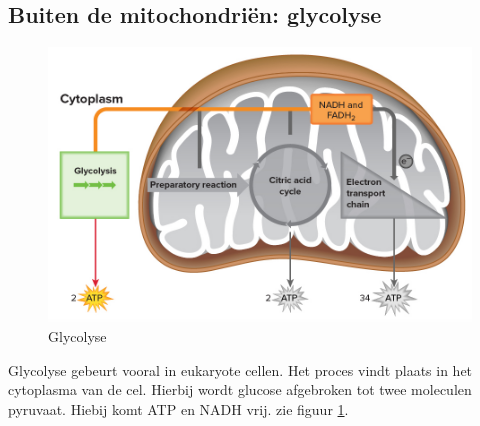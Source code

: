 \documentclass[a4paper,kul]{kulakarticle} %
\begin{document}
\subsection{Buiten de mitochondriën: glycolyse}
\begin{figure}[h]
	\centering
	\includegraphics[width=0.5\linewidth]{MitochondriaGlycolyse}
	\caption[Glycolyse]{Glycolyse}
	\label{fig:mitochondriaglycolyse}
\end{figure}
Glycolyse gebeurt vooral in eukaryote cellen. Het proces vindt plaats in het cytoplasma van de cel. Hierbij wordt glucose afgebroken tot twee moleculen pyruvaat. Hiebij komt ATP en NADH vrij. zie figuur \ref{fig:mitochondriaglycolyse}.
\end{document}
